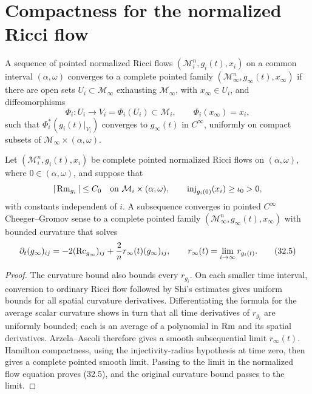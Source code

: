\section{Compactness for the normalized Ricci flow}

\begin{definition}
\label{def:chow-iv-pointed-cheeger-gromov-convergence-nrf}

A sequence of pointed normalized Ricci flows
$(\mathcal M_i^n,g_i(t),x_i)$ on a common interval $(\alpha,\omega)$
converges to a complete pointed family
$(\mathcal M_\infty^n,g_\infty(t),x_\infty)$ if there are open sets
$U_i\subset\mathcal M_\infty$ exhausting $\mathcal M_\infty$, with
$x_\infty\in U_i$, and diffeomorphisms
\[
 \Phi_i:U_i\longrightarrow V_i=\Phi_i(U_i)\subset\mathcal M_i,
 \qquad \Phi_i(x_\infty)=x_i,
\]
such that $\Phi_i^*(g_i(t)|_{V_i})$ converges to $g_\infty(t)$ in
$C^\infty$, uniformly on compact subsets of
$\mathcal M_\infty\times(\alpha,\omega)$.
\end{definition}

\begin{theorem}
\label{thm:chow-iv-hamilton-compactness-nrf}


Let $(\mathcal M_i^n,g_i(t),x_i)$ be complete pointed normalized Ricci
flows on $(\alpha,\omega)$, where $0\in(\alpha,\omega)$, and suppose that
\[
 |\operatorname{Rm}_{g_i}|\le C_0
 \quad\text{on }\mathcal M_i\times(\alpha,\omega),
 \qquad
 \operatorname{inj}_{g_i(0)}(x_i)\ge\iota_0>0,
\]
with constants independent of $i$.  A subsequence converges in pointed
$C^\infty$ Cheeger--Gromov sense to a complete pointed family
$(\mathcal M_\infty^n,g_\infty(t),x_\infty)$ with bounded curvature that
solves
\begin{equation*}
 \partial_t(g_\infty)_{ij}
 =-2(\operatorname{Rc}_{g_\infty})_{ij}+\frac2n r_\infty(t)(g_\infty)_{ij},
 \qquad
 r_\infty(t)=\lim_{i\to\infty}r_{g_i(t)}.
 \tag{32.5}
\end{equation*}
\end{theorem}
\begin{proof}
\sketch
The curvature bound also bounds every $r_{g_i}$.  On each smaller time
interval, conversion to ordinary Ricci flow followed by Shi's estimates
gives uniform bounds for all spatial curvature derivatives.  Differentiating
the formula for the average scalar curvature shows in turn that all time
derivatives of $r_{g_i}$ are uniformly bounded; each is an average of a
polynomial in $\operatorname{Rm}$ and its spatial derivatives.  Arzela--Ascoli therefore
gives a smooth subsequential limit $r_\infty(t)$.  Hamilton compactness,
using the injectivity-radius hypothesis at time zero, then gives a complete
pointed smooth limit.  Passing to the limit in the normalized flow equation
proves (32.5), and the original curvature bound passes to the limit.
\end{proof}

